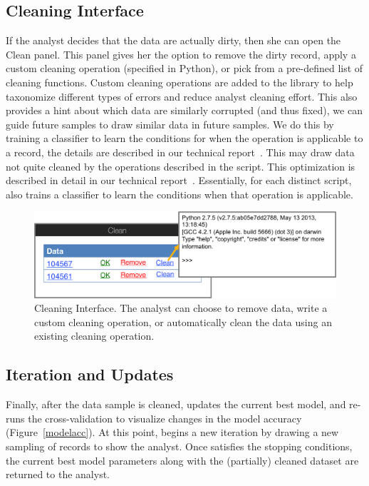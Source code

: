 \subsection{Cleaning Interface}
If the analyst decides that the data are actually dirty, then she can open the \textsf{Clean} panel.
This panel gives her the option to remove the dirty record, apply a custom cleaning operation (specified in Python), or pick from a pre-defined list of cleaning functions.
Custom cleaning operations are added to the library to help taxonomize different types of errors and reduce analyst cleaning effort.
This also provides a hint about which data are similarly corrupted (and thus fixed), we can guide future samples to draw similar data in future samples.
We do this by training a classifier to learn the conditions for when the operation is applicable to a record, the details are described in our technical report~\cite{activecleanarxiv}.
This may draw data not quite cleaned by the operations described in the script.
This optimization is described in detail in our technical report~\cite{activecleanarxiv}. 
Essentially, for each distinct script, \sys also trains a classifier to learn the conditions when that operation is applicable.

\begin{figure}[t]
\centering
 \includegraphics[width=\columnwidth]{figs/interface4.png}
 \caption{Cleaning Interface. The analyst can choose to remove data, write a custom cleaning operation, or automatically clean the data using an existing cleaning operation.}
\end{figure}

\subsection{Iteration and Updates}
Finally, after the data sample is cleaned, \sys updates the current best model, and re-runs the cross-validation to visualize changes in the model accuracy (Figure~\ref{modelacc}).
At this point, \sys begins a new iteration by drawing a new sampling of records to show the analyst.  
Once \sys satisfies the stopping conditions, the current best model parameters along with the (partially) cleaned dataset are returned to the analyst.


